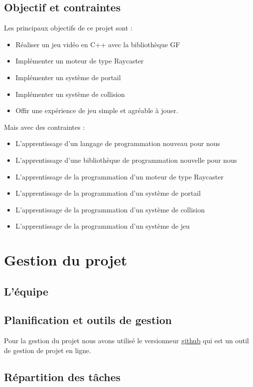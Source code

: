\documentclass[11pt]{article}
\begin{document}
\subsection{Objectif et contraintes}

Les principaux objectifs de ce projet sont :
\begin{itemize}
	\item Réaliser un jeu vidéo en C++ avec la bibliothèque GF
	\item Implémenter un moteur de type Raycaster
	\item Implémenter un système de portail
	\item Implémenter un système de collision
	\item Offir une expérience de jeu simple et agréable à jouer.
\end{itemize}

Mais avec des contraintes :
\begin{itemize}
	\item L'apprentissage d'un langage de programmation nouveau pour nous
	\item L'apprentissage d'une bibliothèque de programmation nouvelle pour nous
	\item L'apprentissage de la programmation d'un moteur de type Raycaster
	\item L'apprentissage de la programmation d'un système de portail
	\item L'apprentissage de la programmation d'un système de collision
	\item L'apprentissage de la programmation d'un système de jeu
\end{itemize}

\section{Gestion du projet}
\subsection{L'équipe}
\subsection{Planification et outils de gestion}

Pour la gestion du projet nous avons utilisé le versionneur \href{https://github.com/}{github}\cite{Github} 
qui est un outil de gestion de projet en ligne.

\subsection{Répartition des tâches}
\end{document}
